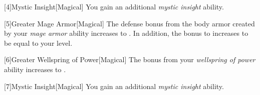         [4]{Mystic Insight}[Magical]
        You gain an additional \textit{mystic insight} ability.

        [5]{Greater Mage Armor}[Magical]
        The defense bonus from the body armor created by your \textit{mage armor} ability increases to .
        In addition, the bonus to  increases to be equal to your level.

        [6]{Greater Wellspring of Power}[Magical]
        The bonus from your \textit{wellspring of power} ability increases to .

        [7]{Mystic Insight}[Magical]
        You gain an additional \textit{mystic insight} ability.
